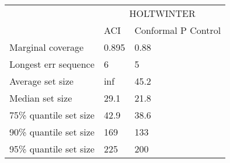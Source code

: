 \begin{tabular}{lll}
\toprule
& \multicolumn{2}{c}{HOLTWINTER} \\
& ACI & Conformal P Control \\
\midrule
Marginal coverage & 0.895 & 0.88 \\
Longest err sequence & 6 & 5 \\
Average set size & inf & 45.2 \\
Median set size & 29.1 & 21.8 \\
75\% quantile set size & 42.9 & 38.6 \\
90\% quantile set size & 169 & 133 \\
95\% quantile set size & 225 & 200 \\
\bottomrule
\end{tabular}
